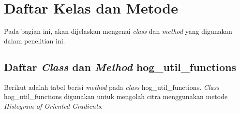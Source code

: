 \section{Daftar Kelas dan Metode}
Pada bagian ini, akan dijelaskan mengenai \textit{class} dan \textit{method} yang digunakan dalam penelitian ini.
\\

\subsection{Daftar \textit{Class} dan \textit{Method} hog\_util\_functions}
Berikut adalah tabel berisi \textit{method} pada \textit{class} hog\_util\_functions. \textit{Class} hog\_util\_functions digunakan untuk mengolah citra menggunakan metode \textit{Histogram of Oriented Gradients}.

